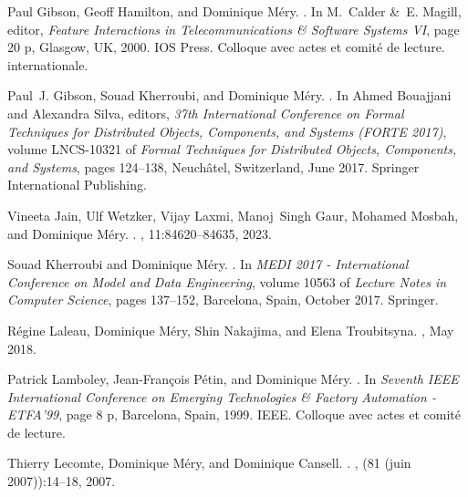 \documentclass[ 12pt]{article}
\begin{document}
\begin{thebibliography}{100}
Paul Gibson, Geoff Hamilton, and Dominique M{\'e}ry.
.
\newblock In M.~Calder \&~E. Magill, editor, {\em {Feature Interactions in
  Telecommunications \& Software Systems VI}}, page 20 p, Glasgow, UK, 2000.
  {IOS Press}.
\newblock Colloque avec actes et comit{\'e} de lecture. internationale.

Paul~J. Gibson, Souad Kherroubi, and Dominique M{\'e}ry.
.
\newblock In Ahmed Bouajjani and Alexandra Silva, editors, {\em {37th
  International Conference on Formal Techniques for Distributed Objects,
  Components, and Systems (FORTE 2017)}}, volume LNCS-10321 of {\em Formal
  Techniques for Distributed Objects, Components, and Systems}, pages 124--138,
  Neuch{\^a}tel, Switzerland, June 2017. {Springer International Publishing}.

Vineeta Jain, Ulf Wetzker, Vijay Laxmi, Manoj~Singh Gaur, Mohamed Mosbah, and
  Dominique M{\'e}ry.
.
, 11:84620--84635, 2023.

Souad Kherroubi and Dominique M{\'e}ry.
.
\newblock In {\em {MEDI 2017 - International Conference on Model and Data
  Engineering}}, volume 10563 of {\em Lecture Notes in Computer Science}, pages
  137--152, Barcelona, Spain, October 2017. {Springer}.

R{\'e}gine Laleau, Dominique M{\'e}ry, Shin Nakajima, and Elena Troubitsyna.
, May 2018.

Patrick Lamboley, Jean-Fran{\c c}ois P{\'e}tin, and Dominique M{\'e}ry.
.
\newblock In {\em {Seventh IEEE International Conference on Emerging
  Technologies \& Factory Automation - ETFA'99}}, page 8 p, Barcelona, Spain,
  1999. {IEEE}.
\newblock Colloque avec actes et comit{\'e} de lecture.

Thierry Lecomte, Dominique M{\'e}ry, and Dominique Cansell.
.
, (81 (juin 2007)):14--18, 2007.


\end{thebibliography}
\end{document}
